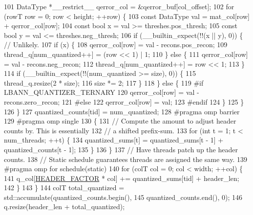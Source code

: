 \begin{DoxyCode}
101       DataType *\_\_restrict\_\_ qerror\_col = &qerror\_buf[col\_offset];
102       \textcolor{keywordflow}{for} (rowT row = 0; row < height; ++row) \{
103         \textcolor{keyword}{const} DataType val = mat\_col[row] + qerror\_col[row];
104         \textcolor{keyword}{const} \textcolor{keywordtype}{bool} x = val >= threshes.pos\_thresh;
105         \textcolor{keyword}{const} \textcolor{keywordtype}{bool} y = val <= threshes.neg\_thresh;
106         \textcolor{keywordflow}{if} (\_\_builtin\_expect(!!(x || y), 0)) \{  \textcolor{comment}{// Unlikely.}
107           \textcolor{keywordflow}{if} (x) \{
108             qerror\_col[row] = val - recons.pos\_recon;
109             thread\_q[num\_quantized++] = (row << 1) | 1;
110           \} \textcolor{keywordflow}{else} \{
111             qerror\_col[row] = val - recons.neg\_recon;
112             thread\_q[num\_quantized++] = row << 1;
113           \}
114           \textcolor{keywordflow}{if} (\_\_builtin\_expect(!!(num\_quantized >= size), 0)) \{
115             thread\_q.resize(2 * size);
116             size *= 2;
117           \}
118         \} \textcolor{keywordflow}{else} \{
119 \textcolor{preprocessor}{#if LBANN\_QUANTIZER\_TERNARY}
120           qerror\_col[row] = val - recons.zero\_recon;
121 \textcolor{preprocessor}{#else}
122           qerror\_col[row] = val;
123 \textcolor{preprocessor}{#endif}
124         \}
125       \}
126     \}
127     quantized\_counts[tid] = num\_quantized;
128 \textcolor{preprocessor}{    #pragma omp barrier}
129 \textcolor{preprocessor}{    #pragma omp single}
130     \{
131       \textcolor{comment}{// Compute the amount to adjust header counts by. This is essentially}
132       \textcolor{comment}{// a shifted prefix-sum.}
133       \textcolor{keywordflow}{for} (\textcolor{keywordtype}{int} t = 1; t < num\_threads; ++t) \{
134         quantized\_sums[t] = quantized\_sums[t - 1] + quantized\_counts[t - 1];
135       \}
136     \}
137     \textcolor{comment}{// Have threads patch up the header counts.}
138     \textcolor{comment}{// Static schedule guarantees threads are assigned the same way.}
139 \textcolor{preprocessor}{    #pragma omp for schedule(static)}
140     \textcolor{keywordflow}{for} (colT col = 0; col < width; ++col) \{
141       q\_col[\hyperlink{classlbann_1_1lbann__quantizer_afb4315625e371169cabfac56c3f75d37}{HEADER\_FACTOR} * col] += quantized\_sums[tid] + header\_len;
142     \}
143   \}
144   colT total\_quantized = std::accumulate(quantized\_counts.begin(),
145                                          quantized\_counts.end(), 0);
146   q.resize(header\_len + total\_quantized);

\end{DoxyCode}
